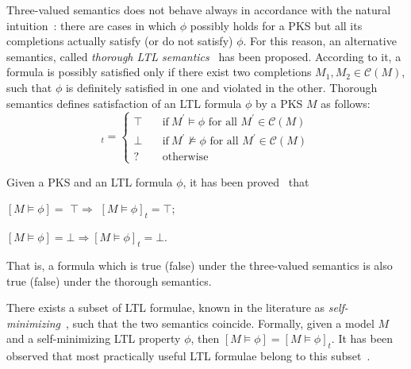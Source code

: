 Three-valued semantics does not behave always in accordance with the natural intuition~\cite{bruns2000model}: there are cases in which $\phi$ possibly holds for a PKS but all its  completions 
actually satisfy (or do not satisfy)  $\phi$.
For this reason, an alternative semantics, called \emph{thorough LTL semantics}~\cite{bruns2000model} has been proposed. 
According to it, a formula is possibly satisfied only if there exist two completions $M_1, M_2 \in \mathcal{C}(M)$, such that $\phi$ is definitely satisfied in one and violated in the other.
Thorough semantics defines satisfaction of an  LTL formula $\phi$ by a PKS $M$ as follows:
\begin{equation}
 [M \models\phi]_t  = 
                						\begin{cases}
                  								\top & \quad  \text{if}\ M^\prime \models \phi \text{ for all } M^\prime \in \mathcal{C}(M)\\
                  								\bot & \quad  \text{if}\ M^\prime \not\models\phi \text{ for all } M^\prime \in \mathcal{C}(M)\\
                  								? &  \quad  \text{otherwise}
                							  \end{cases}      					  		   \nonumber
\end{equation}


Given a PKS and an LTL formula $\phi$, it has been proved~\cite{godefroid2011ltl} that 
\begin{enumerate*}[label={(\arabic*)}]
\item $[M\models\phi] =$ $ \top \Rightarrow$ $ [M\models\phi]_t = \top$;
\item $[M\models\phi] = \bot \Rightarrow [M\models\phi]_t = \bot$.
\end{enumerate*}
That is, a formula which is true (false) under the three-valued semantics is also true (false) under the thorough semantics.

There exists a subset of LTL formulae, known in the literature as \emph{self-minimizing}~\cite{godefroid2005MCvsGMC}, such that the two semantics coincide. Formally,
given a model $M$ and a  self-minimizing LTL property $\phi$, then $[M\models\phi]=[M\models\phi]_t$. It has been observed that most practically useful LTL formulae belong to this subset~\cite{godefroid2005MCvsGMC}.

